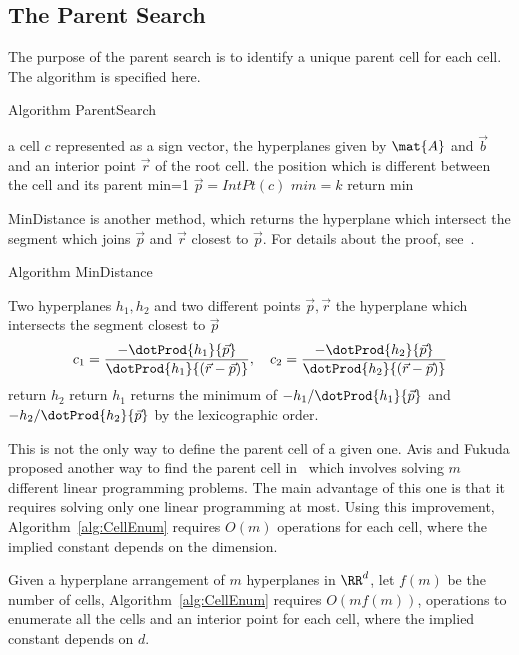 \subsection{The Parent Search}
\label{sec:subParentSearch}
The purpose of the parent search is to identify a unique parent cell
for each cell. The algorithm is specified here.
\begin{algorithm}
  \caption{Algorithm ParentSearch}
  \begin{algorithmic}
  \REQUIRE a cell $c$ represented as a sign vector, the hyperplanes given 
  by $\mat{A}$ and $\vec{b}$ and an interior point $\vec{r}$ of the root cell.
  \ENSURE the position which is different between the cell and its parent
  \STATE min=1
  \STATE $\vec{p}=IntPt(c)$
  \STATE $min=k$
  \ENDIF
  \ENDFOR
  \STATE return min
  \end{algorithmic}
\end{algorithm}
MinDistance is another method, which returns the hyperplane which intersect
the segment which joins $\vec{p}$ and $\vec{r}$ closest to $\vec{p}$.
For details about the proof, see~\cite{SleumerMsc}.
\begin{algorithm}
  \caption{Algorithm MinDistance}
  \begin{algorithmic}
  \REQUIRE Two hyperplanes $h_1,h_2$ and two different points $\vec{p},\vec{r}$
  \ENSURE the hyperplane which intersects the segment closest to $\vec{p}$ 
  \STATE
  \begin{equation*}
    c_1=\frac{-\dotProd{h_1}{\vec{p}}}{\dotProd{h_1}{(\vec{r}-\vec{p})}},
    \quad c_2=\frac{-\dotProd{h_2}{\vec{p}}}{\dotProd{h_2}{(\vec{r}-\vec{p})}}
  \end{equation*}
  \STATE return $h_2$
  \STATE return $h_1$
  \ELSE
  \STATE returns the minimum of $-h_1/\dotProd{h_1}{\vec{p}}$ and 
  $-h_2/\dotProd{h_2}{\vec{p}}$ by the lexicographic order.
  \ENDIF
  \end{algorithmic}
\end{algorithm}
 This is not the only way to define the parent cell of a given one.
Avis and Fukuda proposed another way to find the parent cell in~\cite{AvisFukuda}
which involves solving $m$ different linear programming problems. The main 
advantage of this one is that it requires solving only one linear programming at most.
Using this improvement, Algorithm~\ref{alg:CellEnum} requires $O(m)$ operations 
for each cell, where the implied constant depends on the dimension. 
\begin{theorem}
  \label{thm:timeAlgCellEnum}  
  Given a hyperplane arrangement of $m$ hyperplanes in $\RR^d$, let $f(m)$ be
  the number of cells,   Algorithm~\ref{alg:CellEnum} requires $O(mf(m))$, operations 
  to enumerate all the cells and an interior point for each cell, 
  where the implied constant depends on $d$.
\end{theorem}
 

